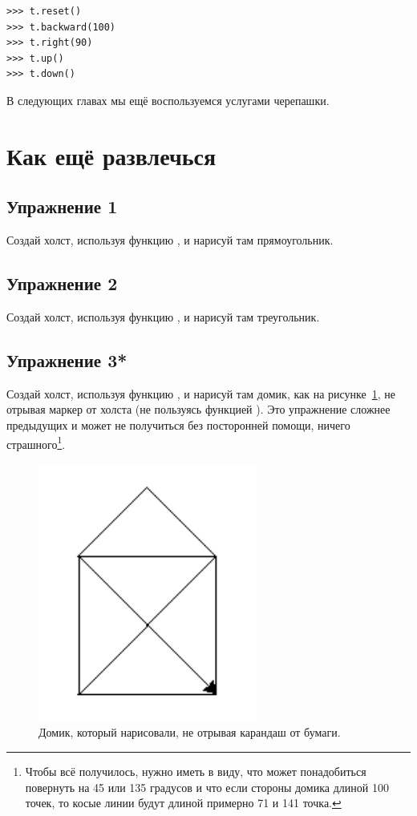 \begin{listing}
\begin{verbatim}
>>> t.reset()
>>> t.backward(100)
>>> t.right(90)
>>> t.up()
>>> t.down()
\end{verbatim}
\end{listing}

В следующих главах мы ещё воспользуемся услугами черепашки.

\section{Как ещё развлечься}


\subsection*{Упражнение 1}
Создай холст, используя функцию , и нарисуй там прямоугольник.

\subsection*{Упражнение 2}
Создай холст, используя функцию , и нарисуй там треугольник.

\subsection*{Упражнение 3*}
Создай холст, используя функцию , и нарисуй там домик, как на рисунке \ref{fighouse}, не отрывая маркер от холста (не пользуясь функцией ). Это упражнение сложнее предыдущих и может не получиться без посторонней помощи, ничего страшного\footnote{Чтобы всё получилось, нужно иметь в виду, что может понадобиться повернуть на 45 или 135 градусов и что если стороны домика длиной 100 точек, то косые линии будут длиной примерно 71 и 141 точка.}.

\begin{figure}
\begin{center}
\includegraphics[width=72mm]{03.house.png}
\end{center}
\caption{Домик, который нарисовали, не отрывая карандаш от бумаги.}\label{fighouse}
\end{figure}

\newpage
